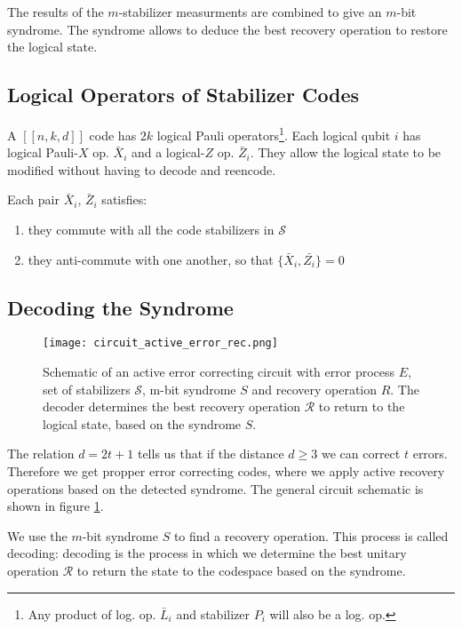 The results of the $m$-stabilizer measurments are combined to give an $m$-bit syndrome.
The syndrome allows to deduce the best recovery operation to restore the logical state.

\subsection{Logical Operators of Stabilizer Codes}

A $[[n,k,d]]$ code has $2k$ logical Pauli operators\footnote{Any product of log. op. $\bar{L}_i$ and stabilizer $P_i$ will also be a log. op.}. 
Each logical qubit $i$ has logical Pauli-$X$ op. $\bar{X}_i$ and a logical-$Z$ op. $\bar{Z}_i$. 
They allow the logical state to be modified without having to decode and reencode. 

Each pair $\bar{X}_i$, $\bar{Z}_i$ satisfies:
\begin{enumerate}
    \item they commute with all the code stabilizers in $\mathcal{S}$
    \item they anti-commute with one another, so that $\{ \bar{X}_i, \bar{Z_i}\}=0$
\end{enumerate}

\subsection{Decoding the Syndrome}

\begin{figure}[h]
    \begin{center}
        \texttt{[image: circuit\_active\_error\_rec.png]}
    \end{center}
    \caption{
    Schematic of an active error correcting circuit with error process $E$, set of stabilizers $\mathcal{S}$, m-bit syndrome $S$ and recovery operation $R$.
    The decoder determines the best recovery operation $\mathcal{R}$ to return to the logical state, based on the syndrome $S$.
    }
    \label{fig:basic.qc.qec_circuit}
\end{figure}

The relation $d = 2t+1$ tells us that if the distance $d\ge 3$ we can correct $t$ errors.
Therefore we get propper error correcting codes, where we apply active recovery operations based on the detected syndrome.
The general circuit schematic is shown in figure \ref{fig:basic.qc.qec_circuit}.

We use the $m$-bit syndrome $S$ to find a recovery operation. 
This process is called decoding: 
decoding is the process in which we determine the best unitary operation $\mathcal{R}$ to return the state to the codespace based on the syndrome.

